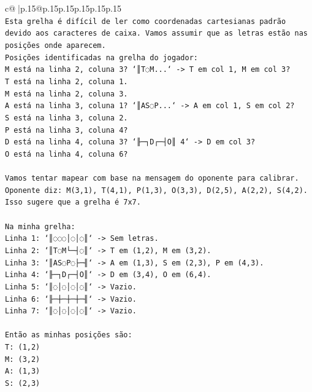 \documentclass{article}
\begin{document}
{\begin{supertabular}{c@{$\;$}|p{.15\linewidth}@{}p{.15\linewidth}p{.15\linewidth}p{.15\linewidth}p{.15\linewidth}p{.15\linewidth}}
{{{\\ 
\texttt{Esta grelha é difícil de ler como coordenadas cartesianas padrão devido aos caracteres de caixa. Vamos assumir que as letras estão nas posições onde aparecem.} \\
\texttt{Posições identificadas na grelha do jogador:} \\
\texttt{M está na linha 2, coluna 3? `║T◌M...` {-}> T em col 1, M em col 3?} \\
\texttt{T está na linha 2, coluna 1.} \\
\texttt{M está na linha 2, coluna 3.} \\
\texttt{A está na linha 3, coluna 1? `║AS◌P...` {-}> A em col 1, S em col 2?} \\
\texttt{S está na linha 3, coluna 2.} \\
\texttt{P está na linha 3, coluna 4?} \\
\texttt{D está na linha 4, coluna 3? `╟─┐D┌─┤O║ 4` {-}> D em col 3?} \\
\texttt{O está na linha 4, coluna 6?} \\
\\ 
\texttt{Vamos tentar mapear com base na mensagem do oponente para calibrar.} \\
\texttt{Oponente diz: M(3,1), T(4,1), P(1,3), O(3,3), D(2,5), A(2,2), S(4,2).} \\
\texttt{Isso sugere que a grelha é 7x7.} \\
\\ 
\texttt{Na minha grelha:} \\
\texttt{Linha 1: `║◌◌◌│◌│◌║` {-}> Sem letras.} \\
\texttt{Linha 2: `║T◌M└─┤◌║` {-}> T em (1,2), M em (3,2).} \\
\texttt{Linha 3: `║AS◌P◌├─╢` {-}> A em (1,3), S em (2,3), P em (4,3).} \\
\texttt{Linha 4: `╟─┐D┌─┤O║` {-}> D em (3,4), O em (6,4).} \\
\texttt{Linha 5: `║◌│◌│◌│◌║` {-}> Vazio.} \\
\texttt{Linha 6: `╟─┼─┼─┼─╢` {-}> Vazio.} \\
\texttt{Linha 7: `║◌│◌│◌│◌║` {-}> Vazio.} \\
\\ 
\texttt{Então as minhas posições são:} \\
\texttt{T: (1,2)} \\
\texttt{M: (3,2)} \\
\texttt{A: (1,3)} \\
\texttt{S: (2,3)} \\
}}}
\end{supertabular}}
\end{document}

